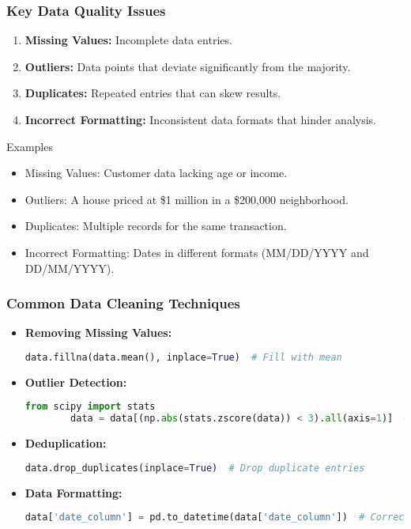 \documentclass[aspectratio=169]{beamer}
\begin{document}
\begin{frame}[fragile]
    \frametitle{Key Data Quality Issues}
    \begin{enumerate}
        \item \textbf{Missing Values:} Incomplete data entries.
        \item \textbf{Outliers:} Data points that deviate significantly from the majority.
        \item \textbf{Duplicates:} Repeated entries that can skew results.
        \item \textbf{Incorrect Formatting:} Inconsistent data formats that hinder analysis.
    \end{enumerate}

    \begin{block}{Examples}
        \begin{itemize}
            \item Missing Values: Customer data lacking age or income.
            \item Outliers: A house priced at \$1 million in a \$200,000 neighborhood.
            \item Duplicates: Multiple records for the same transaction.
            \item Incorrect Formatting: Dates in different formats (MM/DD/YYYY and DD/MM/YYYY).
        \end{itemize}
    \end{block}
\end{frame}

\begin{frame}[fragile]
    \frametitle{Common Data Cleaning Techniques}
    \begin{itemize}
        \item \textbf{Removing Missing Values:}
        \begin{lstlisting}[language=Python]
        data.fillna(data.mean(), inplace=True)  # Fill with mean
        \end{lstlisting}

        \item \textbf{Outlier Detection:}
        \begin{lstlisting}[language=Python]
        from scipy import stats
        data = data[(np.abs(stats.zscore(data)) < 3).all(axis=1)]  # Remove outliers
        \end{lstlisting}
        
        \item \textbf{Deduplication:}
        \begin{lstlisting}[language=Python]
        data.drop_duplicates(inplace=True)  # Drop duplicate entries
        \end{lstlisting}
        
        \item \textbf{Data Formatting:}
        \begin{lstlisting}[language=Python]
        data['date_column'] = pd.to_datetime(data['date_column'])  # Correct formatting
        \end{lstlisting}
    \end{itemize}
\end{frame}
\end{document}
